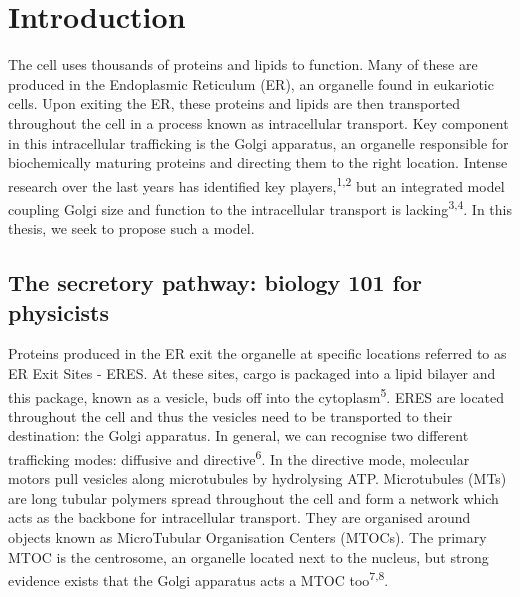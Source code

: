 \documentclass{Dissertate}
\begin{document}
\setcounter{page}{1}
\newpage
{}

\tableofcontents

\newpage

\hypertarget{introduction}{%
\chapter{Introduction}\label{introduction}}

The cell uses thousands of proteins and lipids to function. Many of
these are produced in the Endoplasmic Reticulum (ER), an organelle found
in eukariotic cells. Upon exiting the ER, these proteins and lipids are
then transported throughout the cell in a process known as intracellular
transport. Key component in this intracellular trafficking is the Golgi
apparatus, an organelle responsible for biochemically maturing proteins
and directing them to the right location. Intense research over the last
years has identified key players,\textsuperscript{1,2}
but an integrated model coupling Golgi size and function to the
intracellular transport is
lacking\textsuperscript{3,4}. In this thesis, we seek
to propose such a model.

\hypertarget{the-secretory-pathway-biology-101-for-physicists}{%
\section{The secretory pathway: biology 101 for
physicists}\label{the-secretory-pathway-biology-101-for-physicists}}

Proteins produced in the ER exit the organelle at specific locations
referred to as ER Exit Sites - ERES. At these sites, cargo is packaged
into a lipid bilayer and this package, known as a vesicle, buds off into
the cytoplasm\textsuperscript{5}. ERES are located throughout the cell
and thus the vesicles need to be transported to their destination: the
Golgi apparatus. In general, we can recognise two different trafficking
modes: diffusive and directive\textsuperscript{6}. In the directive
mode, molecular motors pull vesicles along microtubules by hydrolysing
ATP. Microtubules (MTs) are long tubular polymers spread throughout the
cell and form a network which acts as the backbone for intracellular
transport. They are organised around objects known as MicroTubular
Organisation Centers (MTOCs). The primary MTOC is the centrosome, an
organelle located next to the nucleus, but strong evidence exists that
the Golgi apparatus acts a MTOC
too\textsuperscript{7,8}.
\end{document}
